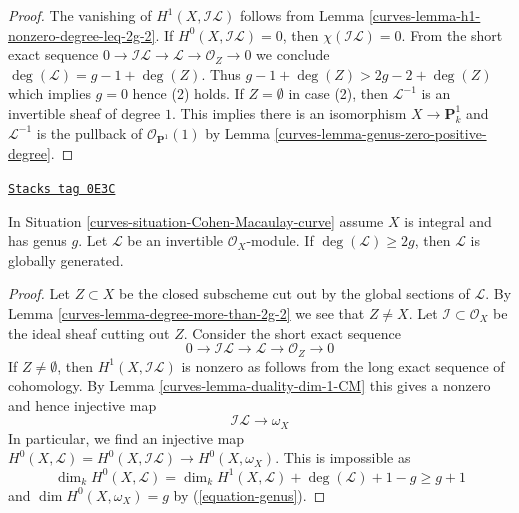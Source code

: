 \begin{proof}

The vanishing of $H^1(X, \mathcal{I}\mathcal{L})$ follows from
Lemma \ref{curves-lemma-h1-nonzero-degree-leq-2g-2}.
If $H^0(X, \mathcal{I}\mathcal{L}) = 0$, then
$\chi(\mathcal{I}\mathcal{L}) = 0$. From the short exact
sequence $0 \to \mathcal{I}\mathcal{L} \to \mathcal{L} \to \mathcal{O}_Z \to 0$
we conclude $\deg(\mathcal{L}) = g - 1 + \deg(Z)$.
Thus $g - 1 + \deg(Z) > 2g - 2 + \deg(Z)$ which implies $g = 0$
hence (2) holds. If $Z = \emptyset$ in case (2),
then $\mathcal{L}^{-1}$ is an invertible sheaf of degree $1$.
This implies there is an isomorphism $X \to \mathbf{P}^1_k$ and
$\mathcal{L}^{-1}$ is the pullback of $\mathcal{O}_{\mathbf{P}^1}(1)$ by
Lemma \ref{curves-lemma-genus-zero-positive-degree}.
\end{proof}

\begin{lemma}
\label{curves-lemma-degree-more-than-2g}
\href{https://stacks.math.columbia.edu/tag/0E3C}{\texttt{Stacks tag 0E3C}}

\begin{reference}
\cite[Lemma 3]{Jongmin}
\end{reference}
In Situation \ref{curves-situation-Cohen-Macaulay-curve}
assume $X$ is integral and has genus $g$.
Let $\mathcal{L}$ be an invertible $\mathcal{O}_X$-module.
If $\deg(\mathcal{L}) \geq 2g$, then $\mathcal{L}$
is globally generated.
\end{lemma}

\begin{proof}

Let $Z \subset X$ be the closed subscheme cut out by the
global sections of $\mathcal{L}$. By Lemma \ref{curves-lemma-degree-more-than-2g-2}
we see that $Z \not = X$. Let $\mathcal{I} \subset \mathcal{O}_X$
be the ideal sheaf cutting out $Z$. Consider the short exact sequence
$$
0 \to \mathcal{I}\mathcal{L}
\to \mathcal{L} \to \mathcal{O}_Z \to 0
$$
If $Z \not = \emptyset$, then
$H^1(X, \mathcal{I}\mathcal{L})$ is nonzero
as follows from the long exact sequence of cohomology.
By Lemma \ref{curves-lemma-duality-dim-1-CM} this gives a
nonzero and hence injective map
$$
\mathcal{I}\mathcal{L}
\longrightarrow
\omega_X
$$
In particular, we find an injective map
$H^0(X, \mathcal{L}) = H^0(X, \mathcal{I}\mathcal{L})
\to H^0(X, \omega_X)$. This is impossible as
$$
\dim_k H^0(X, \mathcal{L}) = \dim_k H^1(X, \mathcal{L}) +
\deg(\mathcal{L}) + 1 - g \geq g + 1
$$
and $\dim H^0(X, \omega_X) = g$ by (\ref{equation-genus}).
\end{proof}

